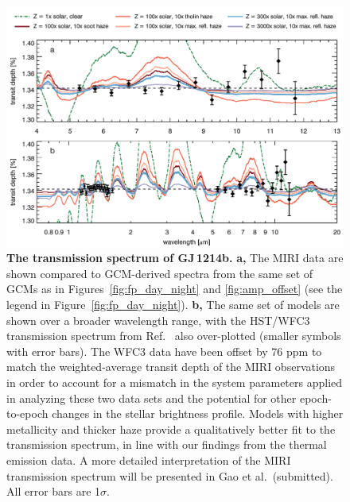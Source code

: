 \documentclass[pdflatex,sn-standardnature]{sn-jnl}%
\begin{document}
\begin{figure}[h]
    \centering
    \includegraphics[width=1.0\textwidth]{transmission.pdf}
    \caption{\textbf{The transmission spectrum of GJ\,1214b.} \textbf{a,} The MIRI data are shown compared to GCM-derived spectra from the same set of GCMs as in Figures~\ref{fig:fp_day_night} and \ref{fig:amp_offset} (see the  legend in Figure~\ref{fig:fp_day_night}). \textbf{b,} The same set of models are shown over a broader wavelength range, with the HST/WFC3 transmission spectrum from Ref.~\cite{kreidberg14} also over-plotted (smaller symbols with error bars). The WFC3 data have been offset by 76 ppm to match the weighted-average transit depth of the MIRI observations in order to account for a mismatch in the system parameters applied in analyzing these two data sets and the potential for other epoch-to-epoch changes in the stellar brightness profile.  Models with higher metallicity and thicker haze provide a qualitatively better fit to the transmission spectrum, in line with our findings from the thermal emission data.  A more detailed interpretation of the MIRI transmission spectrum will be presented in Gao et al.~(submitted). All error bars are 1$\sigma$.}
    \label{fig:transmission} 
\end{figure}
\end{document}
